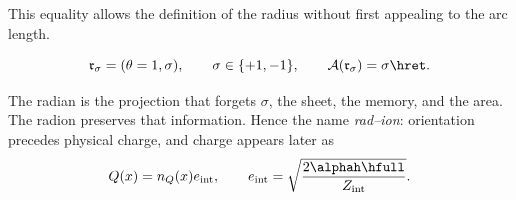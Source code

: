 This equality allows the definition of the radius without first appealing to the arc length.

\begin{definition}
\begin{equation}
\mathfrak r_\sigma=(\theta=1,\sigma),
\qquad \sigma\in\{+1,-1\},
\qquad
\mathcal A(\mathfrak r_\sigma)=\sigma\hret.
\label{eq:radion-oriented}
\end{equation}
\end{definition}

The radian is the projection that forgets \(\sigma\), the sheet, the
memory, and the area. The radion preserves that information. Hence the name
\emph{rad--ion}: orientation precedes
physical charge, and charge appears later as
\[
Q(x)=n_Q(x)e_{\mathrm{int}},\qquad
e_{\mathrm{int}}=\sqrt{\frac{2\alphah\hfull}{Z_{\mathrm{int}}}}.
\]

